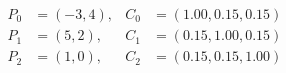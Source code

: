 \documentclass[border=6pt]{standalone}
\begin{document}
\color{white}
\(\displaystyle
\begin{aligned}
P_0 &= (-3,4), & C_0 &= (1.00, 0.15, 0.15) \\
P_1 &= (5,2),  & C_1 &= (0.15, 1.00, 0.15) \\
P_2 &= (1,0),  & C_2 &= (0.15, 0.15, 1.00)
\end{aligned}
\)
\end{document}
